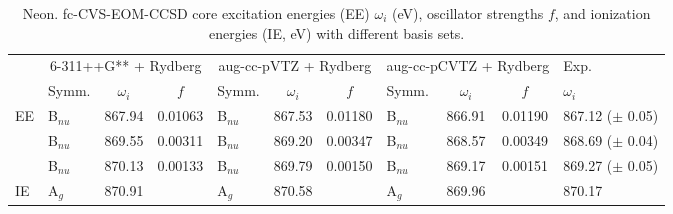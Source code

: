 \documentclass[journal=jctcce,manuscript=article]{achemso}
\begin{document}
\begin{table}[h]
\caption{Neon. fc-CVS-EOM-CCSD core excitation energies (EE) $\omega_i$ (eV), 
oscillator strengths $f$, and ionization energies (IE, eV) with different basis sets.
\label{Tab:Neon}
}
\scriptsize
\begin{tabular}{l|lcc|lcc|lcc|l}
\cline{2-11}
 & \multicolumn{3}{c|}{6-311++G** + Rydberg}
      & \multicolumn{3}{c|}{aug-cc-pVTZ + Rydberg} 
      & \multicolumn{3}{c|}{aug-cc-pCVTZ + Rydberg}
      & Exp.
     \\\cline{2-11}
 & Symm. & $\omega_i$ & $f$ 
 & Symm. & $\omega_i$ & $f$  
 & Symm. & $\omega_i$ & $f$ 
 & $\omega_i$ \\
 \hline
EE 
& B$_{nu}$ & 867.94 & 0.01063 & B$_{nu}$ & 867.53 & 0.01180 & B$_{nu}$ & 866.91 & 0.01190 & 867.12 ($\pm$ 0.05)\cite{Neon_exp} \\
& B$_{nu}$ & 869.55 & 0.00311 & B$_{nu}$ & 869.20 & 0.00347 & B$_{nu}$ & 868.57 & 0.00349 & 868.69 ($\pm$ 0.04)\cite{Neon_exp}\\
& B$_{nu}$ & 870.13 & 0.00133 & B$_{nu}$ & 869.79 & 0.00150 & B$_{nu}$ & 869.17 & 0.00151 & 869.27 ($\pm$ 0.05)\cite{Neon_exp}\\
 \hline
IE 
  & A$_g$& 870.91 & 
  & A$_g$& 870.58 &  
  & A$_g$& 869.96 & & 870.17\cite{Neon_exp_ip} \\
\hline
  \end{tabular}
\end{table}
\end{document}

